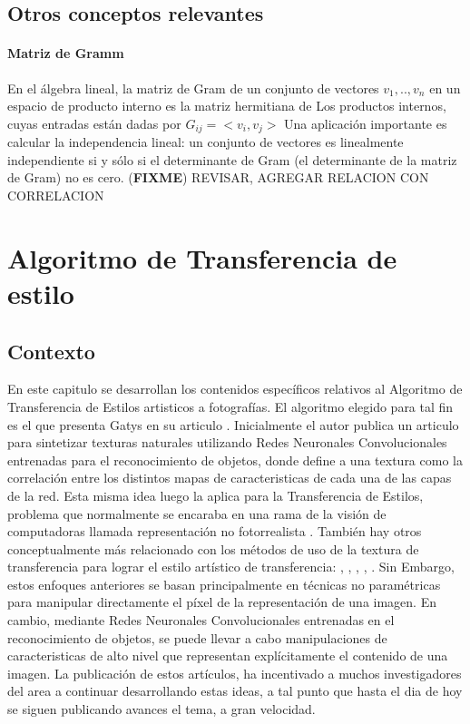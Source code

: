 \documentclass[a4paper,11pt,spanish]{book}
\newcommand*{\FIXME}[1]{{(\textbf{FIXME}) {#1}}}
\begin{document}
     \section {Otros conceptos relevantes}

	\subsubsection{Matriz de Gramm}
	  En el álgebra lineal, la matriz de Gram de un conjunto de vectores $v_{1}, .., v_{n} $ en un espacio de producto interno
	  es la matriz hermitiana de Los productos internos, cuyas entradas están dadas por $G_{ij} = <v_{i}, v_{j}>$
	  Una aplicación importante es calcular la independencia lineal: un conjunto de vectores es linealmente independiente si y sólo si el determinante de Gram
	  (el determinante de la matriz de Gram) no es cero.
	  \FIXME{REVISAR, AGREGAR RELACION CON CORRELACION}

\chapter{Algoritmo de Transferencia de estilo}

    \section{Contexto}
      En este capitulo se desarrollan los contenidos específicos relativos al Algoritmo de Transferencia de Estilos artisticos a fotografías. El algoritmo elegido para tal fin es el que
      presenta Gatys en su articulo \cite{Gatys:Neural_Style}.
      Inicialmente el autor publica un articulo para sintetizar texturas naturales utilizando Redes Neuronales Convolucionales entrenadas para el reconocimiento de objetos,
      donde define a una textura como la correlación entre los distintos mapas de caracteristicas de cada una de las capas de la red.\cite{Gatys:Texture_Synthesis}
      Esta misma idea luego la aplica para la Transferencia de Estilos, problema que normalmente se encaraba en una rama de la visión de computadoras llamada representación
      no fotorrealista \cite{Kyprianidis:ArtisticStylization}. También hay otros conceptualmente más relacionado con los métodos de uso de la textura de transferencia para lograr
      el estilo artístico de transferencia: \cite{Hertzmann:ImageAnalogies}, \cite{Ashikhmin:FastTextureTransfer}, \cite{Efros:ImageQuilting}, \cite{Lee:DirectionalTextureTransfer},
      \cite{Xie:FGTS}. Sin Embargo, estos enfoques anteriores se basan principalmente en técnicas no paramétricas
      para manipular directamente el píxel de la representación de una imagen. En cambio, mediante Redes Neuronales Convolucionales entrenadas en el reconocimiento de objetos,  se puede
      llevar a cabo manipulaciones de caracteristicas de alto nivel que representan explícitamente el contenido de una imagen.
      La publicación de estos artículos, ha incentivado a muchos investigadores del area a continuar desarrollando estas ideas, a tal punto que hasta el dia de hoy se siguen publicando
      avances el tema, a gran velocidad.
\end{document}
